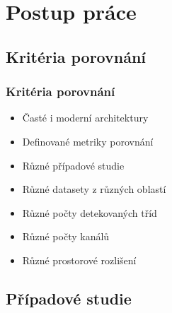 \documentclass[10pt, t]{beamer}
\begin{document}

\section{Postup práce}


\subsection{Kritéria porovnání}


\begin{frame}

\frametitle{Kritéria porovnání}

\begin{itemize}
	\item Časté i moderní architektury
	\item Definované metriky porovnání
	\item Různé případové studie
	\item Různé datasety z různých oblastí
	\item Různé počty detekovaných tříd
	\item Různé počty kanálů
	\item Různé prostorové rozlišení
\end{itemize}

\end{frame}


\subsection{Případové studie}

\end{document}
